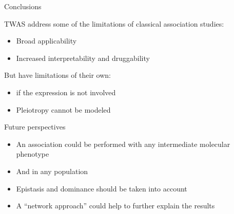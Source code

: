 \documentclass[aspectratio=169,12pt]{beamer}
\begin{document}
\begin{frame}{Conclusions}

	TWAS address some of the limitations of classical association 
studies:

	\begin{itemize}
		\item Broad applicability
		\item Increased interpretability and druggability
	\end{itemize}

	But have limitations of their own:

	\begin{itemize}
		\item if the expression is not involved
		\item Pleiotropy cannot be modeled
	\end{itemize}

\end{frame}

\begin{frame}{Future perspectives}

	\begin{itemize}
		\item<1-> An association could be performed with any 
intermediate molecular phenotype
		\item<2-> And in any population
		\item<3-> Epistasis and dominance should be taken into account
		\item<4-> A \enquote{network approach} could help to further 
explain the results
	\end{itemize}


\end{frame}

\appendix


\begin{frame}[plain]
	\nocite{*}
	\tiny
	\printbibliography[title=References,keyword=TWAS]
\end{frame}
\end{document}
